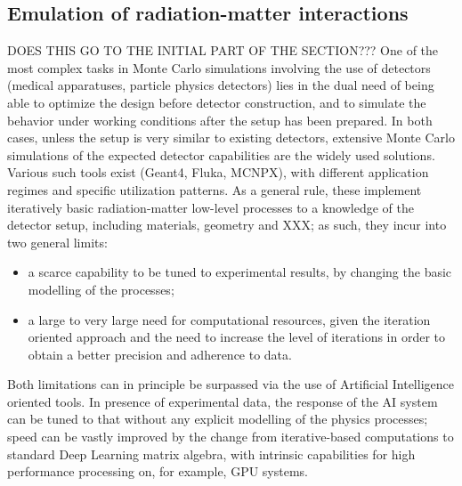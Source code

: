\subsection{Emulation of radiation-matter interactions}
\label{subsec:interactions}

DOES THIS GO TO THE INITIAL PART OF THE SECTION???
One of the most complex tasks in Monte Carlo simulations involving the use of detectors (medical apparatuses, particle physics detectors) lies in the dual need of being able to optimize the design before detector construction, and to simulate the behavior under working conditions after the setup has been prepared.
In both cases, unless the setup is very similar to existing detectors, extensive Monte Carlo simulations of the expected detector capabilities are the widely used solutions. Various such tools exist (Geant4\cite{g4}, Fluka\cite{fluka}, MCNPX\cite{MCNPX}), with different application regimes and specific utilization patterns. As a general rule, these implement iteratively basic radiation-matter low-level processes to a knowledge of the detector setup, including materials, geometry and  XXX; as such, they incur into two general limits:
\begin{itemize}
\item a scarce capability to be tuned to experimental results, by changing the basic modelling of the processes;
\item a large to very large need for computational resources, given the iteration oriented approach and the need to increase the level of iterations in order to obtain a better precision and adherence to data.
\end{itemize}


Both limitations can in principle be surpassed via the use of Artificial Intelligence oriented tools.
In presence of experimental data, the response of the AI system can be tuned to that without any explicit modelling of the physics processes; speed can be vastly improved by the change from iterative-based computations to standard Deep Learning matrix algebra, with intrinsic capabilities for high performance processing on, for example, GPU systems.

